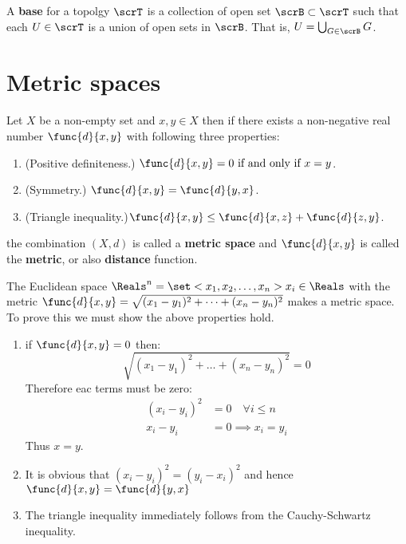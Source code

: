 \begin{definition}
    A \textbf{base} for a topolgy \(\scrT\) is a collection of open set \(\scrB \subset \scrT\) such that each \(U \in \scrT\) is a union of open sets in \(\scrB\). That is, \(U = \bigcup_{G \in \scrB} G\).
\end{definition}

\section{Metric spaces}
Let \(X\) be a non-empty set and \(x,y \in X\) then if there exists a non-negative real number \(\func{d}{x,y}\) with following three properties:
\begin{enumerate}
    \item (Positive definiteness.) \(\func{d}{x,y} = 0 \text{ if and only if } x = y\).
    \item (Symmetry.) \(\func{d}{x,y} = \func{d}{y,x}\).
    \item (Triangle inequality.)\(\func{d}{x,y} \leq \func{d}{x,z} + \func{d}{z,y}\).
\end{enumerate}
the combination \((X,d)\) is called a \textbf{metric space} and \(\func{d}{x,y}\) is called the \textbf{metric}, or also \textbf{distance} function.
\begin{example}
    The Euclidean space \(\Reals^n = \set<x_1,x_2,\dots,x_n>{ x_i \in \Reals}\) with the metric \(\func{d}{x,y}=\sqrt{(x_1-y_1)^2 + \dots + (x_n - y_n)^2} \) makes a metric space. To prove this we must show the above properties hold.
    \begin{enumerate}
        \item if \(\func{d}{x,y} = 0\) then:
              \begin{equation*}  \sqrt{(x_1-y_1)^2 + \dots + (x_n - y_n)^2} = 0  \end{equation*}
              Therefore eac  terms must be zero:
              \begin{align*}
                  (x_i - y_i)^2 & = 0 \quad  \forall i \leq n \\
                  x_i - y_i     & = 0 \implies x_i = y_i
              \end{align*}
              Thus \(x = y\).
        \item  It is obvious that \((x_i - y_i)^2 = (y_i - x_i)^2\) and hence \(\func{d}{x,y} = \func{d}{y,x}\)
        \item  The triangle inequality immediately follows from the Cauchy-Schwartz inequality.
    \end{enumerate}
\end{example}

